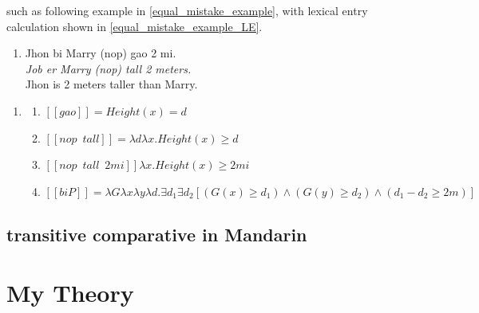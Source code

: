 \documentclass{ctexart}
\begin{document}
such as following example in \ref{equal_mistake_example}, with lexical entry calculation shown in \ref{equal_mistake_example_LE}.

\begin{enumerate}[resume]
    \item \label{equal_mistake_example}
    Jhon bi Marry (nop) gao 2 mi. \\
    \textit{Job er Marry (nop) tall 2 meters.}    \\
    Jhon is 2 meters taller than Marry.
\end{enumerate}

\begin{enumerate}[resume]
    \item \label{equal_mistake_example_LE}
    \begin{enumerate}[ref=(\arabic{enumi}\alph*)]
        \item $[\![gao]\!]=Height(x)=d$
        \item $[\![nop \enspace tall]\!] = \lambda d \lambda x.Height(x) \geq d$
        \item $[\![nop \enspace tall \enspace 2mi]\!] \lambda x.Height(x) \geq 2mi$ 
        \item $[\![biP]\!]=\lambda G \lambda x \lambda y \lambda d. \exists d_1 \exists d_2 [(G(x) \geq d_1) \land (G(y) \geq d_2) \land (d_1-d_2 \geq 2m) ]$
    \end{enumerate}
\end{enumerate} 

\subsection{transitive comparative in Mandarin}






\section{My Theory}

\newpage

\printbibliography
\end{document}
